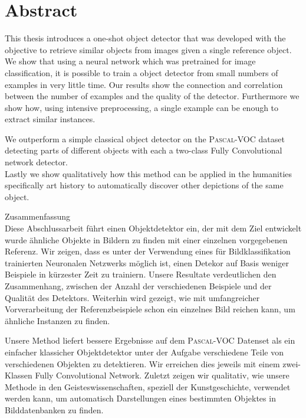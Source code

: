 %
\chapter*{Abstract}
\label{sec:abstract}
\vspace*{-15mm}
This thesis introduces a one-shot object detector that was developed with the objective to retrieve similar objects from images given a single reference object. We show that using a neural network which was pretrained for image classification, it is possible to train a object detector from small numbers of examples in very little time. Our results show the connection and correlation between the number of examples and the quality of the detector. Furthermore we show how, using intensive preprocessing, a single example can be enough to extract similar instances.

We outperform a simple classical object detector on the \textsc{Pascal}-VOC dataset detecting parts of different objects with each a two-class Fully Convolutional network detector.\\
Lastly we show qualitatively how this method can be applied in the humanities specifically art history to automatically discover other depictions of the same object.

\vspace*{0mm}

{Zusammenfassung}\label{sec:abstract-diff} \vspace*{5mm}\\
Diese Abschlussarbeit führt einen Objektdetektor ein, der mit dem Ziel entwickelt wurde ähnliche Objekte in Bildern zu finden mit einer einzelnen vorgegebenen Referenz. Wir zeigen, dass es unter der Verwendung eines für Bildklassifikation trainierten Neuronalen Netzwerks möglich ist, einen Detekor auf Basis weniger Beispiele in kürzester Zeit zu trainiern. Unsere Resultate verdeutlichen den Zusammenhang, zwischen der Anzahl der verschiedenen Beispiele und der Qualität des Detektors. Weiterhin wird gezeigt, wie mit umfangreicher Vorverarbeitung der Referenzbeispiele schon ein einzelnes Bild reichen kann, um ähnliche Instanzen zu finden.

Unsere Method liefert bessere Ergebnisse auf dem \textsc{Pascal}-VOC Datenset als ein einfacher klassicher Objektdetektor unter der Aufgabe verschiedene Teile von verschiedenen Objekten zu detektieren. Wir erreichen dies jeweils mit einem zwei-Klassen Fully Convolutional Network.
Zuletzt zeigen wir qualitativ, wie unsere Methode in den Geisteswissenschaften, speziell der Kunstgeschichte, verwendet werden kann, um automatisch Darstellungen eines bestimmten Objektes in Bilddatenbanken zu finden.
